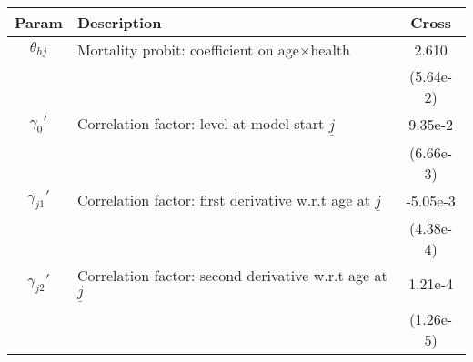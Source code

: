 \begin{table}[ht]\label{CrossWomenCorrParams}
\footnotesize
\begin{center}
\begin{tabular}{clc}
\hline \hline
Param & Description & Cross \\
\hline
$\theta_{hj}$ & Mortality probit: coefficient on age$\times$health & 2.610 \\
 & & (5.64e-2) \\
$\gamma_{0}'$ & Correlation factor: level at model start $\underline{j}$ & 9.35e-2 \\
 & & (6.66e-3) \\
$\gamma_{j1}'$ & Correlation factor: first derivative w.r.t age at $\underline{j}$ & -5.05e-3 \\
 & & (4.38e-4) \\
$\gamma_{j2}'$ & Correlation factor: second derivative w.r.t age at $\underline{j}$ & 1.21e-4 \\
 & & (1.26e-5) \\
\hline\hline
\end{tabular}
\end{center}
\end{table}
